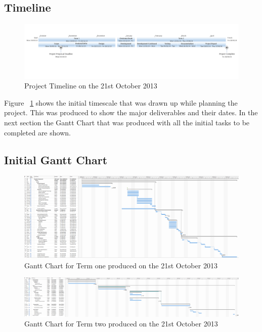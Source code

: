 \newpage 
\begin{landscape}


\subsection{Timeline}

\begin{figure}[H]
  \centering
  \includegraphics[width=\linewidth]{images/timeline1.png}
  \caption{Project Timeline on the 21st October 2013}
  \label{fig:timeline1}
\end{figure}

Figure ~\ref{fig:timeline1} shows the initial timescale that was drawn up while planning the project. This was produced to show the major deliverables and their dates. In the next section the Gantt Chart that was produced with all the initial tasks to be completed are shown. 

\newpage 
\subsection{Initial Gantt Chart}

\begin{figure}[H]
  \centering
  \includegraphics[width=\linewidth]{images/gant_chart1_term1.png}
  \caption{Gantt Chart for Term one produced on the 21st October 2013}
  \label{fig:gantt11}
\end{figure}

\begin{figure}[H]
  \centering
  \includegraphics[width=\linewidth]{images/gant_chart1_term2.png}
  \caption{Gantt Chart for Term two produced on the 21st October 2013}
  \label{fig:gantt12}
\end{figure}



\end{landscape}
